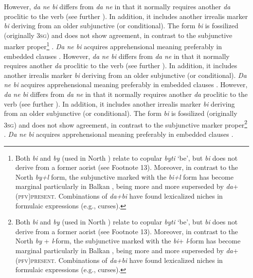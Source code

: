 \documentclass[output=paper,colorlinks,citecolor=brown]{langscibook}
\begin{document}
 However, \textit{da ne bi} differs from \textit{da ne} in that it normally requires another \textit{da} proclitic to the verb (see further ). In addition, it includes another irrealis marker \textit{bi} deriving from an older  subjunctive (or conditional). The form \textit{bi} is fossilized (originally \textsc{3sg}) and does not show agreement, in contrast to the subjunctive marker proper\footnote{Both \textit{bi} and \textit{by} (used in North ) relate to copular \textit{byti} `be', but \textit{bi} does not derive from a former aorist (see Footnote 13). Moreover, in contrast to the North  \textit{by+l} form, the subjunctive marked with the \textit{bi+l} form has become marginal particularly in Balkan , being more and more superseded by \textit{da}+\textsc{(pfv)present}. Combinations of \textit{da+bi} have found lexicalized niches in formulaic expressions (e.g., curses).} \citep[147]{Ivanova2014}. \textit{Da ne bi} acquires apprehensional meaning preferably in embedded clauses \citep[143]{Ivanova2014}.
\noindent However, \textit{da ne bi} differs from \textit{da ne} in that it normally requires another \textit{da} proclitic to the verb (see further ). In addition, it includes another irrealis marker \textit{bi} deriving from an older  subjunctive (or conditional). \textit{Da ne bi} acquires apprehensional meaning preferably in embedded clauses \citep[143]{Ivanova2014}.
\noindent However, \textit{da ne bi} differs from \textit{da ne} in that it normally requires another \textit{da} proclitic to the verb (see further ). In addition, it includes another irrealis marker \textit{bi} deriving from an older  subjunctive (or conditional). The form \textit{bi} is fossilized (originally \textsc{3sg}) and does not show agreement, in contrast to the subjunctive marker proper\footnote{Both \textit{bi} and \textit{by} (used in North ) relate to copular \textit{byti} `be', but \textit{bi} does not derive from a former aorist (see Footnote 13). Moreover, in contrast to the North  \textit{by} + \textit{l}-form, the subjunctive marked with the \textit{bi}+ \textit{l}-form has become marginal particularly in Balkan , being more and more superseded by \textit{da}+\textsc{(pfv)present}. Combinations of \textit{da+bi} have found lexicalized niches in formulaic expressions (e.g., curses).} \citep[147]{Ivanova2014}. \textit{Da ne bi} acquires apprehensional meaning preferably in embedded clauses \citep[143]{Ivanova2014}.
\end{document}

